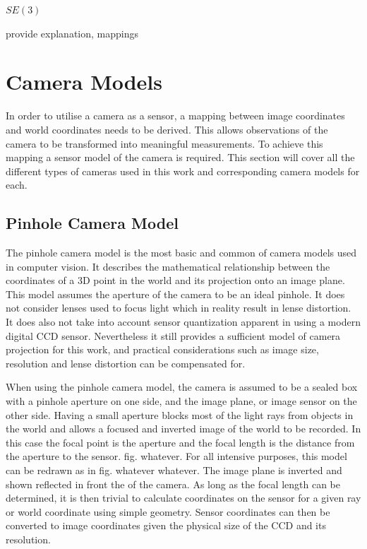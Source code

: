 $SE(3)$

provide explanation, mappings

\section{Camera Models}

In order to utilise a camera as a sensor, a mapping between image coordinates and world coordinates needs to be derived.  This allows observations of the camera to be transformed into meaningful measurements.  To achieve this mapping a sensor model of the camera is required. This section will cover all the different types of cameras used in this work and corresponding camera models for each. 

\subsection{Pinhole Camera Model}
\label{subsec:pinhole_cam}


The pinhole camera model is the most basic and common of camera models used in computer vision.  It describes the mathematical relationship between the coordinates of a 3D point in the world and its projection onto an image plane.  This model assumes the aperture of the camera to be an ideal pinhole. It does not consider lenses used to focus light which in reality result in lense distortion.  It does also not take into account sensor quantization apparent in using a modern digital CCD sensor. Nevertheless it still provides a sufficient model of camera projection for this work, and practical considerations such as image size, resolution and lense distortion can be compensated for.

When using the pinhole camera model, the camera is assumed to be a sealed box with a pinhole aperture on one side, and the image plane, or image sensor on the other side.  Having a small aperture blocks most of the light rays from objects in the world and allows a focused and inverted image of the world to be recorded. In this case the focal point is the aperture and the focal length is the distance from the aperture to the sensor. fig. whatever. For all intensive purposes, this model can be redrawn as in fig. whatever whatever. The image plane is inverted and shown reflected in front the of the camera.  As long as the focal length can be determined, it is then trivial to calculate coordinates on the sensor for a given ray or world coordinate using simple geometry. Sensor coordinates can then be converted to image coordinates given the physical size of the CCD and its resolution.  

